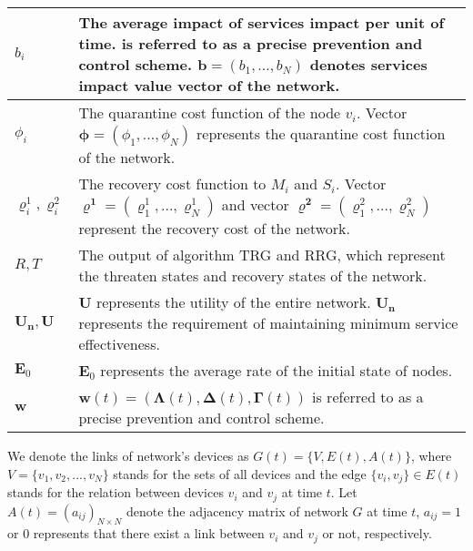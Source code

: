 \documentclass[lettersize,journal]{IEEEtran}
\begin{document}
\begin{table}
{\begin{tabular}{m{2cm}<{\centering}|m{5cm}<{\centering}}
      $b_i$ & The average impact of services impact per unit of time. is referred to as a precise prevention and control scheme. $\bm{b}=(b_1,...,b_N)$ denotes services impact value vector of the network.\\ \hline

      $\phi_i$ & The quarantine cost function of the node $v_i$. Vector $\bm{\phi}=(\phi_1,...,\phi_N)$ represents the quarantine cost function of the network. \\ \hline

      $\varrho^1_i,\varrho^2_i$ & The recovery cost function to $M_i$ and $S_i$. Vector $\bm{\varrho^1}=(\varrho^1_1,...,\varrho^1_N)$ and vector $\bm{\varrho^2}=(\varrho^2_1,...,\varrho^2_N)$ represent the recovery cost of the network. \\ \hline

     $R, T$ & The output of algorithm TRG and RRG, which represent the threaten states and recovery states of the network. \\ \hline

     $\bm{U_n},\bm{U}$ & $\bm{U}$ represents the utility of the entire network. $\bm{U_n}$ represents the requirement of maintaining minimum service effectiveness. \\ \hline

     $\bm{E}_0$ & $\bm{E}_0$ represents the average rate of the initial state of nodes.  \\ \hline

     $\bm{w}$ & $\bm{w}(t)=(\mathbf{\Lambda}(t),\mathbf{\Delta}(t),\mathbf{\Gamma}(t))$ is referred to as a precise prevention and control scheme.    \\ \hline %
    \end{tabular}
    }
     \label{tab:Notion}
\end{table}
 We denote the links of network's devices as $G(t)=\{V,E(t),A(t)\}$, where $V=\{v_1,v_2,...,v_N\}$ stands for the sets of all devices and the edge $ \{v_i, v_j\} \in E(t)$ stands for the relation between devices $v_i$ and $v_j$ at time $t$. Let $A(t)=(a_{ij})_{N \times N}$ denote the adjacency matrix of network $G$ at time $t$, $a_{ij}=1$ or $0$ represents that there exist a link between $v_i$ and $v_j$ or not, respectively.\par
\end{document}
